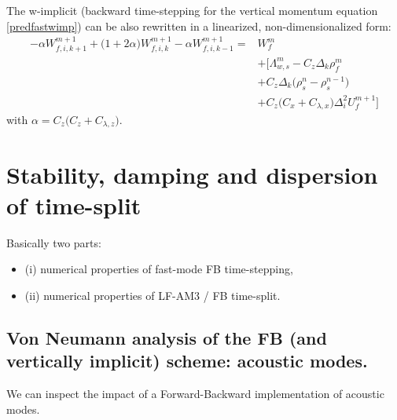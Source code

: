 \documentclass[a4paper]{article}
\numberwithin{equation}{section}
\begin{document}
\begin{itemize}[label=\textbullet,font=\tiny]
 The w-implicit (backward time-stepping for the vertical momentum equation \ref{predfastwimp}) 
 can be also rewritten in a linearized, non-dimensionalized form:
  \begin{equation}
  \label{predfastwimp}
  \begin{split}
    \displaystyle
     -\alpha W_{f,i,k+1}^{m+1}
     +\big(1+2\alpha\big)W_{f,i,k}^{m+1}
     -\alpha W_{f,i,k-1}^{m+1} =&
     W_{f}^m\\[3mm]
     & +\big[\Lambda_{w,s}^m
     -C_z \Delta_k\rho_{f}^m \\[3mm]
     &+C_z\Delta_k
     \big(\rho_{s}^{n}-\rho_{s}^{n-1}\big)\\[3mm]
     &+C_z\big( C_x + C_{\lambda,x} \big)
     \Delta_i^2 U_{f}^{m+1}
     \big]
  \end{split}
  \end{equation}
  with $\alpha=C_z\big(C_z+C_{\lambda,z}\big)$.
  
  \end{itemize}
  
\newpage
\section{Stability, damping and dispersion of time-split}

Basically two parts:

 \begin{itemize}[label=\textbullet,font=\tiny]
  \item (i) numerical properties of fast-mode FB time-stepping,
  \item (ii) numerical properties of LF-AM3 / FB time-split.
 \end{itemize}
 
\subsection{Von Neumann analysis of the FB (and vertically implicit) scheme: acoustic modes.}
\label{Subsec-VNAC}
We can inspect the impact of a Forward-Backward implementation of acoustic modes.
  
\end{document}
